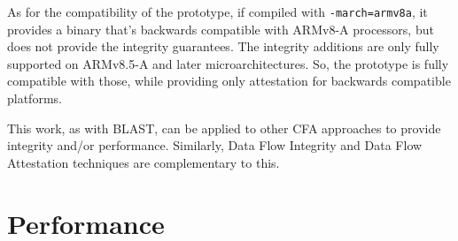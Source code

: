 \documentclass[a4paper, nobind]{templates/ociamthesis}
\begin{document}
As for the compatibility of the prototype, if compiled with \texttt{-march=armv8a}, it
provides a binary that's backwards compatible with ARMv8-A processors,
but does not provide the integrity guarantees.
The integrity additions are only fully supported on ARMv8.5-A and later microarchitectures.
So, the prototype is fully compatible with those, while providing only attestation for
backwards compatible platforms.

This work, as with BLAST, can be applied to other CFA approaches to provide
integrity and/or performance. Similarly, Data Flow Integrity and Data Flow Attestation
techniques are complementary to this.

\section{Performance}\label{performance}
\end{document}
